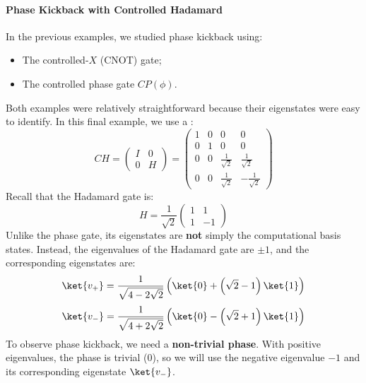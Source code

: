 \paragraph{Phase Kickback with Controlled Hadamard}\label{ex:phase-kickback-with-controlled-hadamard}

In the previous examples, we studied phase kickback using:
\begin{itemize}
    \item The controlled-$X$ (CNOT) gate;
    \item The controlled phase gate $CP(\phi)$.
\end{itemize}
Both examples were relatively straightforward because their eigenstates were easy to identify. In this final example, we use a :
\begin{equation}
    CH = \begin{pmatrix}
        I & 0 \\
        0 & H
    \end{pmatrix} =
    \begin{pmatrix}
        1 & 0 & 0 & 0 \\
        0 & 1 & 0 & 0 \\
        0 & 0 & \frac{1}{\sqrt{2}} & \frac{1}{\sqrt{2}} \\
        0 & 0 & \frac{1}{\sqrt{2}} & -\frac{1}{\sqrt{2}}
    \end{pmatrix}
\end{equation}
Recall that the Hadamard gate is:
\begin{equation*}
    H = \frac{1}{\sqrt{2}}\begin{pmatrix}
        1 & 1 \\
        1 & -1
    \end{pmatrix}
\end{equation*}
Unlike the phase gate, its eigenstates are \textbf{not} simply the computational basis states. Instead, the eigenvalues of the Hadamard gate are $\pm 1$, and the corresponding eigenstates are:
\begin{equation*}
    \ket{v_+} = \frac{1}{\sqrt{4-2\sqrt{2}}} \left(\ket{0} + \left(\sqrt{2} - 1\right)\ket{1}\right)
\end{equation*}
\begin{equation*}
    \ket{v_-} = \frac{1}{\sqrt{4+2\sqrt{2}}} \left(\ket{0} - \left(\sqrt{2} + 1\right)\ket{1}\right)
\end{equation*}
To observe phase kickback, we need a \textbf{non-trivial phase}. With positive eigenvalues, the phase is trivial (0), so we will use the negative eigenvalue $-1$ and its corresponding eigenstate $\ket{v_-}$.

